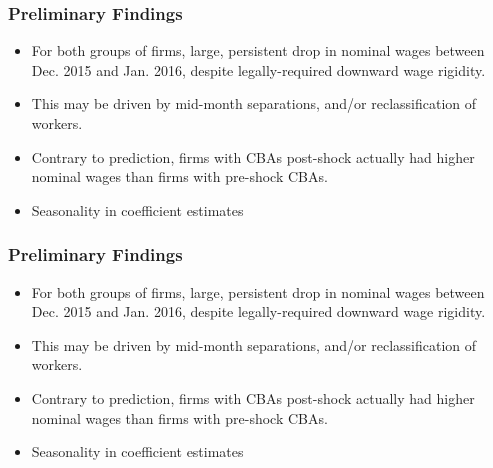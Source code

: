 \documentclass[aspectratio=169]{beamer}
\begin{document}
		\begin{frame}
			\frametitle{Preliminary Findings}
			\begin{itemize}
				\item For both groups of firms, large, persistent drop in nominal wages between Dec. 2015 and Jan. 2016, despite legally-required downward wage rigidity.
				\item This may be driven by mid-month separations, and/or reclassification of workers.
				\item Contrary to prediction, firms with CBAs post-shock actually had higher nominal wages than firms with pre-shock CBAs. 
				\item Seasonality in coefficient estimates
			\end{itemize}
		\end{frame} 

			\begin{frame}
			\frametitle{Preliminary Findings}
			\begin{itemize}
				\item For both groups of firms, large, persistent drop in nominal wages between Dec. 2015 and Jan. 2016, despite legally-required downward wage rigidity.
				\item This may be driven by mid-month separations, and/or reclassification of workers.
				\item Contrary to prediction, firms with CBAs post-shock actually had higher nominal wages than firms with pre-shock CBAs. 
				\item Seasonality in coefficient estimates
			\end{itemize}
			{\color{red}{Possible explanations: optimism, sectoral heterogeneity, cyclicality in workers' bargaining power, regime switching. }}
		\end{frame} 
\end{document}
